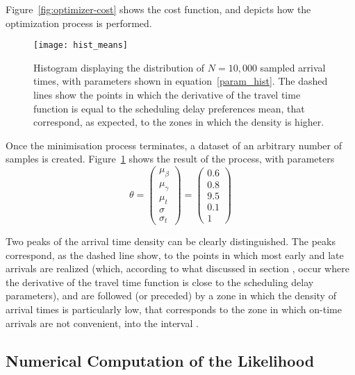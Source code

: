 Figure~\ref{fig:optimizer-cost} shows the cost function,
and depicts how the optimization process is performed.

\begin{figure}
  \centering
  \texttt{[image: hist\_means]}
  \caption{
    Histogram displaying the distribution of \(N=10,000\) sampled arrival times,
    with parameters shown in equation~\eqref{param_hist}.
    The dashed lines show the points in which the derivative of the travel time function is equal to the scheduling delay preferences mean,
    that correspond, as expected,
    to the zones in which the density is higher.
  }
  \label{fig:hist-means}
\end{figure}

Once the minimisation process terminates,
a dataset of an arbitrary number of samples is created.
Figure~\ref{fig:hist-means} shows the result of the process,
with parameters
\begin{equation}
  \label{param_hist}
  \theta =
  \begin{pmatrix}
    \mu_\beta \\
    \mu_\gamma \\
    \mu_t \\
    \sigma \\
    \sigma_t
  \end{pmatrix}
  =
  \begin{pmatrix}
    0.6 \\
    0.8 \\
    9.5 \\
    0.1 \\
    1
  \end{pmatrix}
\end{equation}

Two peaks of the arrival time density can be clearly distinguished.
The peaks correspond, as the dashed line show, to the points in which most early and late arrivals are realized
(which, according to what discussed in section ,
occur where the derivative of the travel time function is close to the scheduling delay parameters),
and are followed (or preceded) by a zone in which the density of arrival times is particularly low,
that corresponds to the zone in which on-time arrivals are not convenient,
into the interval .

\subsection{Numerical Computation of the Likelihood}

